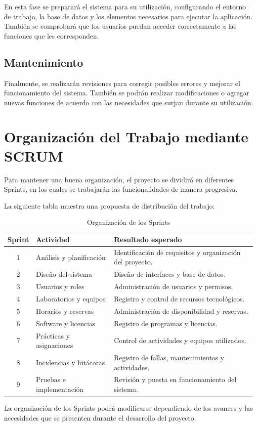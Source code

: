 En esta fase se preparará el sistema para su utilización, configurando el entorno de trabajo, la base de datos y los elementos necesarios para ejecutar la aplicación. También se comprobará que los usuarios puedan acceder correctamente a las funciones que les corresponden.

\subsection{Mantenimiento}

Finalmente, se realizarán revisiones para corregir posibles errores y mejorar el funcionamiento del sistema. También se podrán realizar modificaciones o agregar nuevas funciones de acuerdo con las necesidades que surjan durante su utilización.

\section{Organización del Trabajo mediante SCRUM}

Para mantener una buena organización, el proyecto se dividirá en diferentes Sprints, en los cuales se trabajarán las funcionalidades de manera progresiva.

La siguiente tabla muestra una propuesta de distribución del trabajo:

\begin{table}[htbp]
\centering
\caption{Organización de los Sprints}
\label{tab:sprints}
\begin{tabular}{|c|p{5cm}|p{6cm}|}
\hline
\textbf{Sprint} & \textbf{Actividad} & \textbf{Resultado esperado} \\ \hline

1 & Análisis y planificación & Identificación de requisitos y organización del proyecto. \\ \hline

2 & Diseño del sistema & Diseño de interfaces y base de datos. \\ \hline

3 & Usuarios y roles & Administración de usuarios y permisos. \\ \hline

4 & Laboratorios y equipos & Registro y control de recursos tecnológicos. \\ \hline

5 & Horarios y reservas & Administración de disponibilidad y reservas. \\ \hline

6 & Software y licencias & Registro de programas y licencias. \\ \hline

7 & Prácticas y asignaciones & Control de actividades y equipos utilizados. \\ \hline

8 & Incidencias y bitácoras & Registro de fallas, mantenimientos y actividades. \\ \hline

9 & Pruebas e implementación & Revisión y puesta en funcionamiento del sistema. \\ \hline

\end{tabular}
\end{table}

La organización de los Sprints podrá modificarse dependiendo de los avances y las necesidades que se presenten durante el desarrollo del proyecto.
